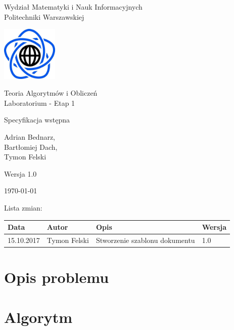 \documentclass[12pt,a4paper]{article}
\theoremstyle{definition}
\begin{document}
\begin{titlepage}
	\centering
	{\Large Wydział Matematyki i Nauk Informacyjnych\\Politechniki Warszawskiej \par}
	\vspace{1cm}
	\includegraphics[width=0.2\textwidth]{res/img/logo.png} \par
	\vspace{4cm}
	{\LARGE Teoria Algorytmów i Obliczeń\\Laboratorium - Etap 1 \par}
	\vspace{0.5cm}
	{\LARGE Specyfikacja wstępna \par}
	\vspace{2cm}
	{\large Adrian Bednarz,\\Bartłomiej Dach,\\Tymon Felski \par}
	\vspace{2cm}
	{\large Wersja 1.0 \par}
	\vspace{0.5cm}
	{\large \today \par}
\end{titlepage}

\noindent
Lista zmian:\\[.5\baselineskip]
\begin{tabularx}{\textwidth}{|l|l|X|l|}
	\hline
	\textbf{Data} & \textbf{Autor} & \textbf{Opis} & \textbf{Wersja} \\
	\hline
	15.10.2017 & Tymon Felski & Stworzenie szablonu dokumentu & 1.0 \\
	\hline
\end{tabularx}

\newpage
\tableofcontents
\newpage

\section{Opis problemu}

\section{Algorytm}
\end{document}
